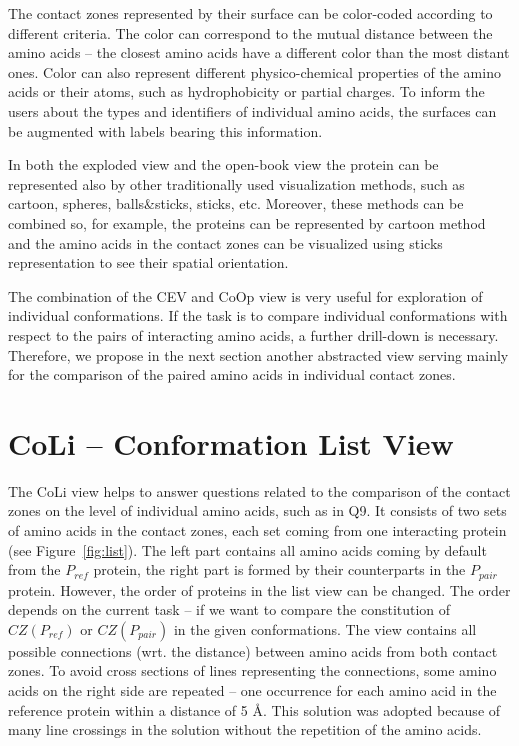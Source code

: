 \documentclass[journal]{vgtc}                %
\begin{document}
The contact zones represented by their surface can be color-coded according to different criteria.
The color can correspond to the mutual distance between the amino acids -- the closest amino acids have a different color than the most distant ones.
Color can also represent different physico-chemical properties of the amino acids or their atoms, such as hydrophobicity or partial charges.
To inform the users about the types and identifiers of individual amino acids, the surfaces can be augmented with labels bearing this information.

In both the exploded view and the open-book view the protein can be represented also by other traditionally used visualization methods, such as cartoon, spheres, balls\&sticks, sticks, etc.
Moreover, these methods can be combined so, for example, the proteins can be represented by cartoon method and the amino acids in the contact zones can be visualized using sticks representation to see their spatial orientation.%

The combination of the CEV and CoOp view is very useful for exploration of individual conformations.
If the task is to compare individual conformations with respect to the pairs of interacting amino acids, a further drill-down is necessary.
Therefore, we propose in the next section another abstracted view serving mainly for the comparison of the paired amino acids in individual contact zones.

\section{CoLi -- Conformation List View}
The CoLi view helps to answer questions related to the comparison of the contact zones on the level of individual amino acids, such as in Q9.
It consists of two sets of amino acids in the contact zones, each set coming from one interacting protein (see Figure~\ref{fig:list}).
The left part contains all amino acids coming by default from the $P_{ref}$ protein, the right part is formed by their counterparts in the $P_{pair}$ protein.
However, the order of proteins in the list view can be changed.
The order depends on the current task -- if we want to compare the constitution of $CZ(P_{ref})$ or $CZ(P_{pair})$ in the given conformations.
The view contains all possible connections (wrt. the distance) between amino acids from both contact zones.
To avoid cross sections of lines representing the connections, some amino acids on the right side are repeated -- one occurrence for each amino acid in the reference protein within a distance of 5 \AA. 
This solution was adopted because of many line crossings in the solution without the repetition of the amino acids.
\end{document}
